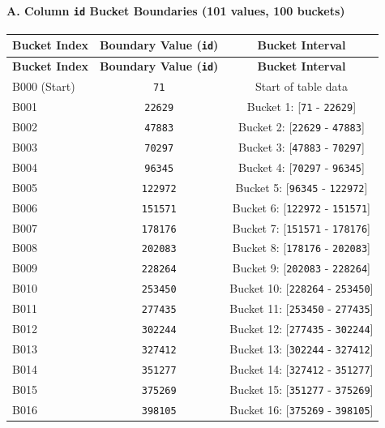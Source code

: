 \documentclass[11pt,a4paper]{article}
\begin{document}
\paragraph{A. Column \texttt{id} Bucket Boundaries (101 values, 100 buckets)}
{\begingroup
\small
\setlength{\tabcolsep}{5pt}
\begin{xltabular}{\textwidth}{l | C | C}
\toprule
\textbf{Bucket Index} & \textbf{Boundary Value (\texttt{id})} & \textbf{Bucket Interval} \\
\midrule
\endfirsthead
\toprule
\textbf{Bucket Index} & \textbf{Boundary Value (\texttt{id})} & \textbf{Bucket Interval} \\
\midrule
\endfirsthead
\endhead
\bottomrule
\endfoot
\bottomrule
\endlastfoot
B000 (Start) & \texttt{71} & Start of table data \\
B001 & \texttt{22629} & Bucket 1: [\texttt{71} - \texttt{22629}] \\
B002 & \texttt{47883} & Bucket 2: [\texttt{22629} - \texttt{47883}] \\
B003 & \texttt{70297} & Bucket 3: [\texttt{47883} - \texttt{70297}] \\
B004 & \texttt{96345} & Bucket 4: [\texttt{70297} - \texttt{96345}] \\
B005 & \texttt{122972} & Bucket 5: [\texttt{96345} - \texttt{122972}] \\
B006 & \texttt{151571} & Bucket 6: [\texttt{122972} - \texttt{151571}] \\
B007 & \texttt{178176} & Bucket 7: [\texttt{151571} - \texttt{178176}] \\
B008 & \texttt{202083} & Bucket 8: [\texttt{178176} - \texttt{202083}] \\
B009 & \texttt{228264} & Bucket 9: [\texttt{202083} - \texttt{228264}] \\
B010 & \texttt{253450} & Bucket 10: [\texttt{228264} - \texttt{253450}] \\
B011 & \texttt{277435} & Bucket 11: [\texttt{253450} - \texttt{277435}] \\
B012 & \texttt{302244} & Bucket 12: [\texttt{277435} - \texttt{302244}] \\
B013 & \texttt{327412} & Bucket 13: [\texttt{302244} - \texttt{327412}] \\
B014 & \texttt{351277} & Bucket 14: [\texttt{327412} - \texttt{351277}] \\
B015 & \texttt{375269} & Bucket 15: [\texttt{351277} - \texttt{375269}] \\
B016 & \texttt{398105} & Bucket 16: [\texttt{375269} - \texttt{398105}] \\

\end{xltabular}}
\end{document}
